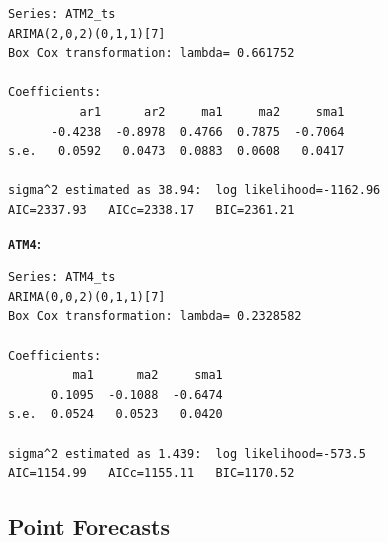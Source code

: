 \documentclass[openany]{book}
\begin{document}
\begin{verbatim}
Series: ATM2_ts 
ARIMA(2,0,2)(0,1,1)[7] 
Box Cox transformation: lambda= 0.661752 

Coefficients:
          ar1      ar2     ma1     ma2     sma1
      -0.4238  -0.8978  0.4766  0.7875  -0.7064
s.e.   0.0592   0.0473  0.0883  0.0608   0.0417

sigma^2 estimated as 38.94:  log likelihood=-1162.96
AIC=2337.93   AICc=2338.17   BIC=2361.21
\end{verbatim}

\textbf{\texttt{ATM4}:}

\begin{verbatim}
Series: ATM4_ts 
ARIMA(0,0,2)(0,1,1)[7] 
Box Cox transformation: lambda= 0.2328582 

Coefficients:
         ma1      ma2     sma1
      0.1095  -0.1088  -0.6474
s.e.  0.0524   0.0523   0.0420

sigma^2 estimated as 1.439:  log likelihood=-573.5
AIC=1154.99   AICc=1155.11   BIC=1170.52
\end{verbatim}

\hypertarget{forecast-a}{%
\subsection*{Point Forecasts}\label{forecast-a}}
\end{document}
